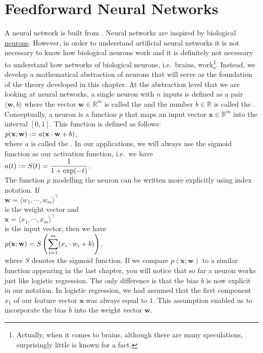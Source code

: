 \section{Feedforward Neural Networks}
A neural network is built from .  Neural networks are inspired by biological 
\href{https://en.wikipedia.org/wiki/Neuron}{neurons}.  However, in order to understand artificial neural
networks it is not necessary to know how biological neurons work and it is definitely not necessary to
understand how networks of biological neurons, i.e.~brains, work\footnote{
  Actually, when it comes to brains, although there are many speculations, surprisingly little is known for a fact.  
}.  
Instead, we develop a mathematical
abstraction of neurons that will serve as the foundation of the theory developed in this chapter.
At the abstraction level that we are looking at neural networks, a single neuron with $n$ inputs is defined as
a pair $\langle \mathbf{w}, b\rangle$ where the 
vector $\mathbf{w} \in \mathbb{R}^m$ is called the  and the number $b \in \mathbb{R}$ is called the .  
Conceptually, a neuron is a function $p$ that maps an input vector $\mathbf{x} \in \mathbb{R}^m$ into the
interval $[0,1]$.  This function is defined as follows:
\\[0.2cm]
\hspace*{1.3cm}
$\displaystyle p(\mathbf{x}; \mathbf{w}) := a(\mathbf{x} \cdot \mathbf{w} + b)$,
\\[0.2cm]
where $a$ is called the .  In our applications, we will always use the sigmoid
function as our activation function, i.e.~we have
\\[0.2cm]
\hspace*{1.3cm}
$\displaystyle a(t) := S(t) = \frac{1}{1 + \exp(-t)}$.
\\[0.2cm]
The function $p$ modelling the neuron can be written more explicitly using index notation.  If
\\[0.2cm]
\hspace*{1.3cm}
$\mathbf{w} = \langle w_1, \cdots, w_m \rangle^\top$ 
\\[0.2cm]
is the weight vector and 
\\[0.2cm]
\hspace*{1.3cm}
$\mathbf{x} = \langle x_1, \cdots, x_m \rangle^\top$
\\[0.2cm]
is the input vector, then we have
\\[0.2cm]
\hspace*{1.3cm}
$\displaystyle p(\mathbf{x}; \mathbf{w}) = S\left(\sum\limits_{i=1}^m (x_i \cdot w_i + b)\right)$,
\\[0.2cm]
where $S$ denotes the sigmoid function.  If we compare $p(\mathbf{x}; \mathbf{w})$ 
to a similar function appearing in the last chapter, you will notice 
that so far a neuron works just like logistic regression.  The only difference is that the bias $b$
is now explicit in our notation.  In logistic regression, we had assumed that the first component $x_1$ of our
feature vector $\mathbf{x}$ was always equal to $1$.  This assumption enabled us to incorporate the bias $b$ into the
weight vector $\mathbf{w}$.

